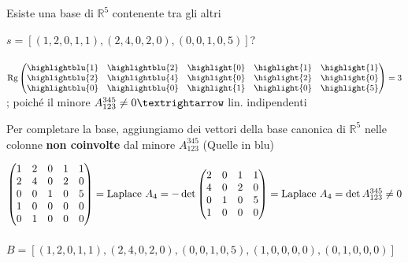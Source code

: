 \begin{esercizio}
  Esiste una base di $\mathbb{R}^5$ contenente tra gli altri

  $s=[(1,2,0,1,1),(2,4,0,2,0),(0,0,1,0,5)]$?
  \leavevmode\\\\
  $
  \textnormal{Rg}
  \begin{pmatrix}
    \highlightblu{1} &\highlightblu{2} &\highlight{0} &\highlight{1}
    &\highlight{1}\\
    \highlightblu{2} &\highlightblu{4} &\highlight{0} &\highlight{2}
    &\highlight{0}\\
    \highlightblu{0} &\highlightblu{0} &\highlight{1} &\highlight{0}
    &\highlight{5}
  \end{pmatrix}=3
  $ ; poiché il minore $A^{345}_{123}\neq 0\textrightarrow$ lin. indipendenti

  Per completare la base, aggiungiamo dei vettori della base canonica
  di $\mathbb{R}^5$ nelle colonne \textbf{non coinvolte} dal minore
  $A^{345}_{123}$ (Quelle in blu)

  $
  \begin{pmatrix}
    1 &2 &0 &1 &1\\
    2 &4 &0 &2 &0\\
    0 &0 &1 &0 &5\\
    1 &0 &0 &0 &0\\
    0 &1 &0 &0 &0
  \end{pmatrix}=\textnormal{Laplace }A_4=-\det
  \begin{pmatrix}
    2 &0 &1 &1\\
    4 &0 &2 &0\\
    0 &1 &0 &5\\
    1 &0 &0 &0
  \end{pmatrix}=\textnormal{Laplace }A_4=\det A^{345}_{123}\neq 0
  $
  \leavevmode\\\\
  $B=[(1,2,0,1,1),(2,4,0,2,0),(0,0,1,0,5),(1,0,0,0,0),(0,1,0,0,0)]$
\end{esercizio}
